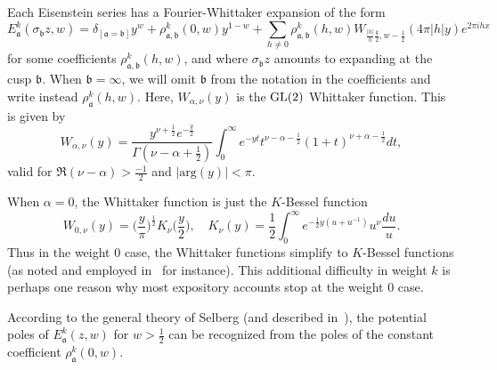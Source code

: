 Each Eisenstein series has a Fourier-Whittaker expansion of the form
\begin{equation}
  E_\mathfrak{a}^k(\sigma_\mathfrak{b} z,w) = \delta_{[\mathfrak{a} = \mathfrak{b}]}y^w +
  \rho_{\mathfrak{a}, \mathfrak{b}}^k(0, w) y^{1-w} + \sum_{h \neq 0}
  \rho_{\mathfrak{a}, \mathfrak{b}}^k(h, w) W_{\frac{|h|}{h}\frac{k}{2}, w - \frac{1}{2}}(4\pi \lvert h
  \rvert y) e^{2\pi i h x}
\end{equation}
for some coefficients $\rho_{\mathfrak{a}, \mathfrak{b}}^k(h,w)$, and where
$\sigma_\mathfrak{b} z$ amounts to expanding at the cusp $\mathfrak{b}$.
When $\mathfrak{b} = \infty$, we will omit $\mathfrak{b}$ from the notation in the
coefficients and write instead $\rho_{\mathfrak{a}}^k(h,w)$.
Here, $W_{\alpha, \nu}(y)$ is the $\operatorname{GL}(2)$ Whittaker function.
This is given by~\cite[3.6.3]{GoldfeldHundleyI}
\begin{equation}
  W_{\alpha, \nu}(y) = \frac{y^{\nu + \frac{1}{2}}
  e^{-\frac{y}{2}}}{\Gamma(\nu - \alpha + \frac{1}{2})}
  \int_0^\infty e^{-yt} t^{\nu - \alpha - \frac{1}{2}}
  (1+t)^{\nu + \alpha - \frac{1}{2}} dt,
\end{equation}
valid for $\Re(\nu - \alpha) > \frac{-1}{2}$
and $\lvert \text{arg}(y) \rvert < \pi$.


When $\alpha = 0$, the Whittaker function is just the $K$-Bessel function
\begin{equation}
  W_{0, \nu}(y) = \big( \frac{y}{\pi}\big)^{\frac{1}{2}} K_\nu\big( \frac{y}{2} \big),
  \quad
  K_\nu(y) = \frac{1}{2} \int_0^\infty e^{-\frac{1}{2} y(u + u^{-1})}
  u^\nu \frac{du}{u}.
\end{equation}
Thus in the weight $0$ case, the Whittaker functions simplify to $K$-Bessel functions (as
noted and employed in~\cite{Goldfeld2006automorphic} for instance).
This additional difficulty in weight $k$ is perhaps one reason why most expository
accounts stop at the weight $0$ case.


According to the general theory of Selberg (and described in~\cite[Theorem
13.2]{Iwaniec97}), the potential poles of $E_\mathfrak{a}^k(z,w)$ for $w > \frac{1}{2}$
can be recognized from the poles of the constant coefficient $\rho_{\mathfrak{a}}^k(0,w)$.




